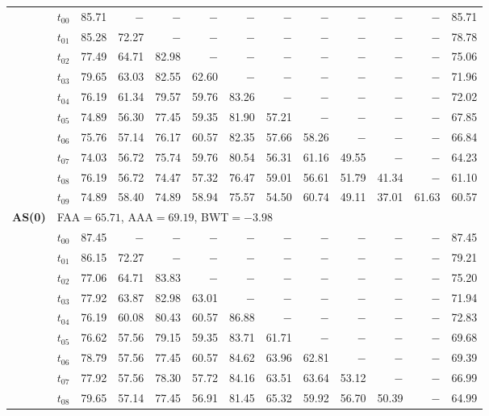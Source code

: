 \begin{table}[ht]
\begin{tabular}{@{}l l r r r r r r r r r r r@{}}
 & $t_{00}$ & 85.71 & $-$ & $-$ & $-$ & $-$ & $-$ & $-$ & $-$ & $-$ & $-$ & 85.71 \\
 & $t_{01}$ & 85.28 & 72.27 & $-$ & $-$ & $-$ & $-$ & $-$ & $-$ & $-$ & $-$ & 78.78 \\
 & $t_{02}$ & 77.49 & 64.71 & 82.98 & $-$ & $-$ & $-$ & $-$ & $-$ & $-$ & $-$ & 75.06 \\
 & $t_{03}$ & 79.65 & 63.03 & 82.55 & 62.60 & $-$ & $-$ & $-$ & $-$ & $-$ & $-$ & 71.96 \\
 & $t_{04}$ & 76.19 & 61.34 & 79.57 & 59.76 & 83.26 & $-$ & $-$ & $-$ & $-$ & $-$ & 72.02 \\
 & $t_{05}$ & 74.89 & 56.30 & 77.45 & 59.35 & 81.90 & 57.21 & $-$ & $-$ & $-$ & $-$ & 67.85 \\
 & $t_{06}$ & 75.76 & 57.14 & 76.17 & 60.57 & 82.35 & 57.66 & 58.26 & $-$ & $-$ & $-$ & 66.84 \\
 & $t_{07}$ & 74.03 & 56.72 & 75.74 & 59.76 & 80.54 & 56.31 & 61.16 & 49.55 & $-$ & $-$ & 64.23 \\
 & $t_{08}$ & 76.19 & 56.72 & 74.47 & 57.32 & 76.47 & 59.01 & 56.61 & 51.79 & 41.34 & $-$ & 61.10 \\
 & $t_{09}$ & 74.89 & 58.40 & 74.89 & 58.94 & 75.57 & 54.50 & 60.74 & 49.11 & 37.01 & 61.63 & 60.57 \\
\midrule
\multirow{11}{*}{\textbf{AS(0)}} & \multicolumn{12}{l}{\quad\small FAA$=65.71$,\; AAA$=69.19$,\; BWT$=-3.98$} \\
 & $t_{00}$ & 87.45 & $-$ & $-$ & $-$ & $-$ & $-$ & $-$ & $-$ & $-$ & $-$ & 87.45 \\
 & $t_{01}$ & 86.15 & 72.27 & $-$ & $-$ & $-$ & $-$ & $-$ & $-$ & $-$ & $-$ & 79.21 \\
 & $t_{02}$ & 77.06 & 64.71 & 83.83 & $-$ & $-$ & $-$ & $-$ & $-$ & $-$ & $-$ & 75.20 \\
 & $t_{03}$ & 77.92 & 63.87 & 82.98 & 63.01 & $-$ & $-$ & $-$ & $-$ & $-$ & $-$ & 71.94 \\
 & $t_{04}$ & 76.19 & 60.08 & 80.43 & 60.57 & 86.88 & $-$ & $-$ & $-$ & $-$ & $-$ & 72.83 \\
 & $t_{05}$ & 76.62 & 57.56 & 79.15 & 59.35 & 83.71 & 61.71 & $-$ & $-$ & $-$ & $-$ & 69.68 \\
 & $t_{06}$ & 78.79 & 57.56 & 77.45 & 60.57 & 84.62 & 63.96 & 62.81 & $-$ & $-$ & $-$ & 69.39 \\
 & $t_{07}$ & 77.92 & 57.56 & 78.30 & 57.72 & 84.16 & 63.51 & 63.64 & 53.12 & $-$ & $-$ & 66.99 \\
 & $t_{08}$ & 79.65 & 57.14 & 77.45 & 56.91 & 81.45 & 65.32 & 59.92 & 56.70 & 50.39 & $-$ & 64.99 \\

\end{tabular}
\end{table}

